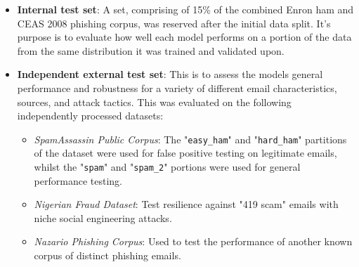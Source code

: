 \begin{itemize}
  \item \textbf{Internal test set}: A set, comprising of 15\% of the combined Enron ham and CEAS 2008 phishing corpus, was reserved after the initial data split. It's purpose is to evaluate how well each model performs on a portion of the data from the same distribution it was trained and validated upon.
  \item \textbf{Independent external test set}: This is to assess the models general performance and robustness for a variety of different email characteristics, sources, and attack tactics. This was evaluated on the following independently processed datasets:
  \begin{itemize}
    \item \textit{SpamAssassin Public Corpus}: The "\texttt{easy\_ham}" and "\texttt{hard\_ham}" partitions of the dataset were used for false positive testing on legitimate emails, whilst the "\texttt{spam}" and "\texttt{spam\_2}" portions were used for general performance testing.
    \item \textit{Nigerian Fraud Dataset}: Test resilience against "419 scam" emails with niche social engineering attacks.
    \item \textit{Nazario Phishing Corpus}: Used to test the performance of another known corpus of distinct phishing emails.
  \end{itemize}
\end{itemize}
